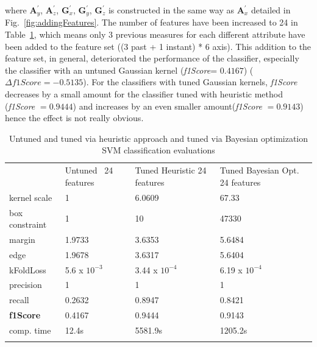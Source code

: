 where $\bm{A}_y^{'}$, $\bm{A}_z^{'}$, $\bm{G}_x^{'}$, $\bm{G}_y^{'}$, $\bm{G}_z^{'}$ is constructed in the same way as  $\bm{A}_x^{'}$ detailed in Fig.~\ref{fig:addingFeatures}.
The number of features have been increased to 24 in Table~\ref{tab:contSurfStuckAddedFeat}, which means only 3 previous measures for each different attribute have been added to the feature set ((3 past + 1 instant) * 6 axis).
This addition to the feature set, in general, deteriorated the performance of the classifier, especially the classifier with an untuned Gaussian kernel (\emph{f1Score}= $0.4167$) ($\Delta f1Score = -0.5135$). 
For the classifiers with tuned Gaussian kernels, \emph{f1Score} decreases by a small amount for the classifier tuned with heuristic method (\emph{f1Score} $= 0.9444$) and increases by an even smaller amount(\emph{f1Score} $= 0.9143$) hence the effect is not really obvious. 


\begin{table}[h]
	\centering
\caption{Untuned and tuned via heuristic approach and tuned via Bayesian optimization SVM classification evaluations}
\label{tab:contSurfStuckAddedFeat}       %
\begin{tabular}{p{2.6cm}p{2cm}p{2.5cm}p{2.7cm}}
\hline\noalign{\smallskip}
 & Untuned \ 24 features & Tuned Heuristic 24 features & Tuned Bayesian Opt. 24 features\\
\noalign{\smallskip}\hline\noalign{\smallskip}
kernel scale & 1 & 6.0609 & 67.33 \\
box constraint & 1 & 10 &  47330\\
margin & 1.9733 & 3.6353 & 5.6484 \\
edge & 1.9678 & 3.6317 & 5.6404 \\
kFoldLoss & 5.6 x $10^{-3}$ & 3.44 x $10^{-4}$ & 6.19 x $10^{-4}$ \\
precision & 1 & 1 & 1 \\
recall & 0.2632 & 0.8947 & 0.8421\\
\textbf{f1Score} & 0.4167 & 0.9444 & 0.9143 \\
comp. time & 12.4s & 5581.9s &1205.2s \\
\noalign{\smallskip}\hline
\end{tabular}
\end{table}

